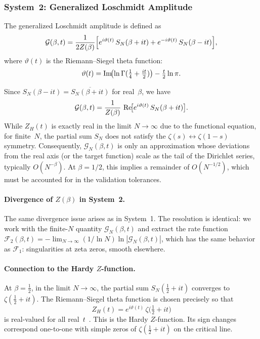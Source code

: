 \subsubsection{System~2: Generalized Loschmidt Amplitude}
\label{sec:system2}

The generalized Loschmidt amplitude is defined as
\begin{equation}\label{eq:G-def}
  \mathcal{G}(\beta,t) = \frac{1}{2Z(\beta)}
  \Bigl[e^{i\vartheta(t)}\,S_N(\beta+it)
  + e^{-i\vartheta(t)}\,S_N(\beta-it)\Bigr],
\end{equation}
where $\vartheta(t)$ is the Riemann--Siegel theta function:
\begin{equation}\label{eq:theta-def}
  \vartheta(t) = \operatorname{Im}\!\bigl(\ln\Gamma(\tfrac{1}{4}+\tfrac{it}{2})\bigr)
  - \tfrac{t}{2}\ln\pi.
\end{equation}

Since $S_N(\beta-it) = \overline{S_N(\beta+it)}$ for real~$\beta$, we have
\begin{equation}\label{eq:G-real}
  \mathcal{G}(\beta,t) = \frac{1}{Z(\beta)}\,
  \operatorname{Re}\!\bigl[e^{i\vartheta(t)}\,S_N(\beta+it)\bigr].
\end{equation}
While $Z_H(t)$ is exactly real in the limit $N \to \infty$ due to the functional 
equation, for finite~$N$, the partial sum $S_N$ does not satisfy the 
$\zeta(s) \leftrightarrow \zeta(1-s)$ symmetry. Consequently, 
$\mathcal{G}_N(\beta, t)$ is only an approximation whose deviations from 
the real axis (or the target function) scale as the tail of the Dirichlet series, 
typically $O(N^{-\beta})$. At $\beta=1/2$, this implies a remainder of 
$O(N^{-1/2})$, which must be accounted for in the validation tolerances.


\paragraph{Divergence of $Z(\beta)$ in System~2.}
The same divergence issue arises as in System~1. The resolution is identical: we work
with the finite-$N$ quantity $\mathcal{G}_N(\beta,t)$ and extract the rate function
$\mathcal{F}_2(\beta,t) = -\lim_{N\to\infty}(1/\ln N)\ln|\mathcal{G}_N(\beta,t)|$,
which has the same behavior as $\mathcal{F}_1$: singularities at zeta zeros, smooth
elsewhere.

\paragraph{Connection to the Hardy $Z$-function.}
At $\beta = \tfrac{1}{2}$, in the limit $N \to \infty$, the partial sum
$S_N(\tfrac{1}{2}+it)$ converges to $\zeta(\tfrac{1}{2}+it)$. The Riemann--Siegel
theta function is chosen precisely so that
\begin{equation}\label{eq:hardy-z}
  Z_H(t) = e^{i\vartheta(t)}\,\zeta\!\bigl(\tfrac{1}{2}+it\bigr)
\end{equation}
is real-valued for all real~$t$~\cite{hardy1914}. This is the Hardy $Z$-function. Its
sign changes correspond one-to-one with simple zeros of $\zeta(\tfrac{1}{2}+it)$ on the
critical line.

